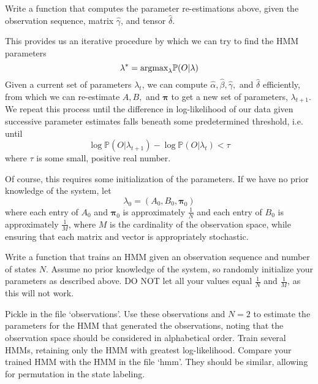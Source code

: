 \begin{problem}
Write a function that computes the parameter re-estimations above, given the observation sequence, matrix $\widehat{\gamma}$, and tensor $\widehat{\delta}$.
\end{problem}

This provides us an iterative procedure by which we can try to find the HMM parameters \begin{equation*}
\lambda^{*} = \mbox{argmax}_{\lambda} \mathbb{P}(O | \lambda)
\end{equation*}
Given a current set of parameters $\lambda_{t}$, we can compute $\widehat{\alpha}, \widehat{\beta}, \widehat{\gamma},$ and $\widehat{\delta}$ efficiently, from which we can re-estimate $A, B,$ and $\mathbf{\pi}$ to get a new set of parameters, $\lambda_{t+1}$. We repeat this process until the difference in log-likelihood of our data given successive parameter estimates falls beneath some predetermined threshold, i.e. until $$\log \mathbb{P}(O | \lambda_{t+1}) - \log \mathbb{P}(O | \lambda_{t}) < \tau$$ where $\tau$ is some small, positive real number.

Of course, this requires some initialization of the parameters. If we have no prior knowledge of the system, let 
\begin{equation*}
\lambda_{0} = \left( A_{0}, B_{0}, \mathbf{\pi}_{0} \right)
\end{equation*}
where each entry of $A_{0}$ and $\mathbf{\pi}_{0}$ is approximately $\frac{1}{N}$ and each entry of $B_{0}$ is approximately $\frac{1}{M}$, where $M$ is the cardinality of the observation space, while ensuring that each matrix and vector is appropriately stochastic.

\begin{problem}
Write a function that trains an HMM given an observation sequence and number of states $N$. Assume no prior knowledge of the system, so randomly initialize your parameters as described above. DO NOT let all your values equal $\frac{1}{N}$ and $\frac{1}{M}$, as this will not work.
\end{problem}

\begin{problem}
Pickle in the file `observations'. Use these observations and $N = 2$ to estimate the parameters for the HMM that generated the observations, noting that the observation space should be considered in alphabetical order. Train several HMMs, retaining only the HMM with greatest log-likelihood. Compare your trained HMM with the HMM in the file `hmm'. They should be similar, allowing for permutation in the state labeling.
\end{problem}